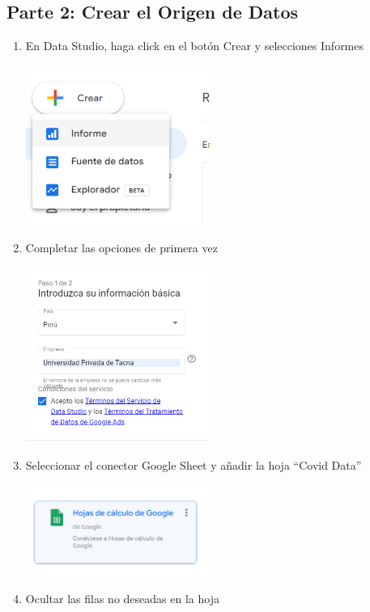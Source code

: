 \documentclass[12pt,letterpaper]{article}
\newcommand\tab[1][1cm]{\hspace*{#1}}
\begin{document}
    \subsection{Parte 2: Crear el Origen de Datos}
    \begin{enumerate}[\tab 1.]
        \item En Data Studio, haga click en el botón Crear y selecciones Informes
        \begin{center}
            \includegraphics[width=6cm]{./img/img3.png}
        \end{center}
        \item Completar las opciones de primera vez
        \begin{center}
            \includegraphics[width=6cm]{./img/img4.png}
        \end{center}
        \item Seleccionar el conector Google Sheet y añadir la hoja “Covid Data”
        \begin{center}
            \includegraphics[width=6cm]{./img/img5.png}
        \end{center}
        \item Ocultar las filas no deseadas en la hoja

\end{enumerate}
\end{document}
